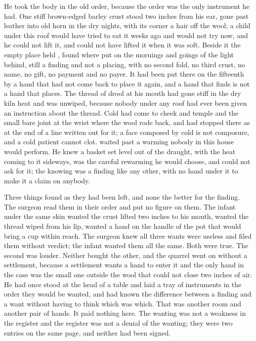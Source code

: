 He took the body in the old order, because the order was the only instrument he had. One stiff brown-edged barley crust stood two inches from his ear, gone past leather into old horn in the dry nights, with its corner a hair off the wool; a child under this roof would have tried to eat it weeks ago and would not try now, and he could not lift it, and could not have lifted it when it was soft. Beside it the empty place held , found where put on the mornings and goings of the light behind, still a finding and not a placing, with no second fold, no third crust, no name, no gift, no payment and no payer. It had been put there on the fifteenth by a hand that had not come back to place it again, and a hand that finds is not a hand that places. The thread of drool at his mouth had gone stiff in the dry kiln heat and was unwiped, because nobody under any roof had ever been given an instruction about the thread. Cold had come to cheek and temple and the small bare joint at the wrist where the wool rode back, and had stopped there as at the end of a line written out for it; a face composed by cold is not composure, and a cold patient cannot clot.  waited past a warming nobody in this house would perform. He knew a basket set level out of the draught, with the heat coming to it sideways, was the careful rewarming he would choose, and could not ask for it; the knowing was a finding like any other, with no hand under it to make it a claim on anybody.

Three things found as they had been left, and none the better for the finding. The surgeon read them in their order and put no figure on them. The infant under the same skin wanted the crust lifted two inches to his mouth, wanted the thread wiped from his lip, wanted a hand on the handle of the pot that would bring a cup within reach. The surgeon knew all three wants were useless and filed them without verdict; the infant wanted them all the same. Both were true. The second was louder. Neither bought the other, and the quarrel went on without a settlement, because a settlement wants a hand to enter it and the only hand in the case was the small one outside the wool that could not close two inches of air. He had once stood at the head of a table and laid a tray of instruments in the order they would be wanted, and had known the difference between a finding and a want without having to think which was which. That was another room and another pair of hands. It paid nothing here. The wanting was not a weakness in the register and the register was not a denial of the wanting; they were two entries on the same page, and neither had been signed.

